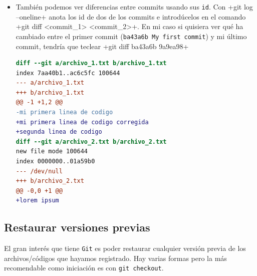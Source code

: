 \documentclass[a5paper,10pt]{article}
\begin{document}
\begin{enumerate}
\begin{itemize}
      \item También podemos ver diferencias entre commits usando sus \verb+id+. Con \cverb+git log --oneline+ anota los id de dos de los commits e introdúcelos en el comando \cverb+git diff <commit_1> <commit_2>+. En mi caso si quisiera ver qué ha cambiado entre el primer commit (\verb+ba43a6b My first commit+) y mi último commit, tendría que teclear \cverb+git diff ba43a6b 9a9ea98+
      
      \begin{lstlisting}[language=diff]
diff --git a/archivo_1.txt b/archivo_1.txt
index 7aa40b1..ac6c5fc 100644
--- a/archivo_1.txt
+++ b/archivo_1.txt
@@ -1 +1,2 @@
-mi primera linea de codigo
+mi primera linea de codigo corregida
+segunda linea de codigo
diff --git a/archivo_2.txt b/archivo_2.txt
new file mode 100644
index 0000000..01a59b0
--- /dev/null
+++ b/archivo_2.txt
@@ -0,0 +1 @@
+lorem ipsum

      \end{lstlisting}
      
    \end{itemize}
    \end{enumerate}
  \subsection{Restaurar versiones previas}
    El gran interés que tiene \verb+Git+ es poder restaurar cualquier versión previa de los archivos/códigos que hayamos registrado. Hay varias formas pero la más recomendable como iniciación es con \verb+git checkout+.
    
\end{document}
